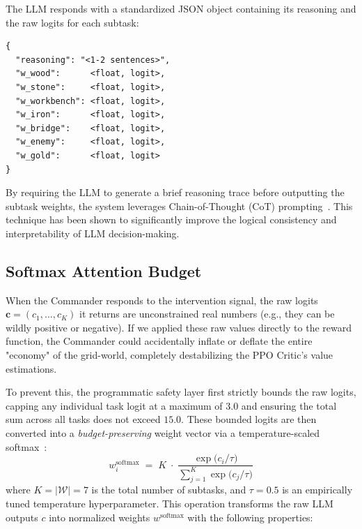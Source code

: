 The LLM responds with a standardized JSON object containing its reasoning and the raw logits for each subtask:

\begin{hegquote}
\begin{verbatim}
{
  "reasoning": "<1-2 sentences>",
  "w_wood":      <float, logit>,
  "w_stone":     <float, logit>,
  "w_workbench": <float, logit>,
  "w_iron":      <float, logit>,
  "w_bridge":    <float, logit>,
  "w_enemy":     <float, logit>,
  "w_gold":      <float, logit>
}
\end{verbatim}
\end{hegquote}

By requiring the LLM to generate a brief reasoning trace before outputting the subtask weights, the system leverages Chain-of-Thought (CoT) prompting~\parencite{Wei_Wang_Schuurmans_Bosma_Ichter_Xia_Chi_Le_Zhou_2022}. This technique has been shown to significantly improve the logical consistency and interpretability of LLM decision-making.

\subsection{Softmax Attention Budget}
\label{sec:softmax_budget}

When the Commander responds to the intervention signal, the raw logits $\boldsymbol{c}=(c_1,\dots,c_K)$ it returns are unconstrained real numbers (e.g., they can be wildly positive or negative). If we applied these raw values directly to the reward function, the Commander could accidentally inflate or deflate the entire "economy" of the grid-world, completely destabilizing the PPO Critic's value estimations.

To prevent this, the programmatic safety layer first strictly bounds the raw logits, capping any individual task logit at a maximum of $3.0$ and ensuring the total sum across all tasks does not exceed $15.0$. These bounded logits are then converted into a \emph{budget-preserving} weight vector via a temperature-scaled softmax~\parencite{Sutton_Barto_2018}:
\begin{equation}
\label{eq:softmax_budget}
\boxed{
    w_i^{\text{softmax}}
    \;=\;
    K \;\cdot\;
    \frac{
        \exp\!\bigl(c_i / \tau\bigr)
    }{
        \displaystyle\sum_{j=1}^{K}
        \exp\!\bigl(c_j / \tau\bigr)
    }
}
\end{equation}
where $K=|\mathcal{W}|=7$ is the total number of subtasks, and $\tau=0.5$ is an empirically tuned temperature hyperparameter. This operation transforms the raw LLM outputs $c$ into normalized weights $w^{\text{softmax}}$ with the following properties:

